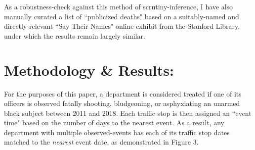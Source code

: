 \documentclass[12pt,a4paper]{article}
\begin{document}
As a robustness-check against this method of scrutiny-inference, I have also manually curated a list of ``publicized deaths" based on a suitably-named and directly-relevant ``Say Their Names" online exhibit from the Stanford Library, under which the results remain largely similar. \\


\section{Methodology \& Results:}

For the purposes of this paper, a department is considered treated if one of its officers is observed fatally shooting, bludgeoning, or asphyxiating an unarmed black subject between 2011 and 2018. Each traffic stop is then assigned an ``event time" based on the number of days to the nearest event. As a result, any department with multiple observed-events has each of its traffic stop dates matched to the \textit{nearest} event date, as demonstrated in Figure 3. \\
\end{document}
